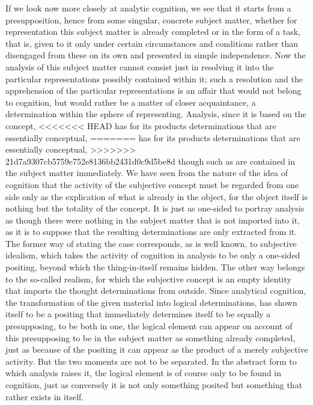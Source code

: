 If we look now more closely at analytic cognition,
we see that it starts from a presupposition,
hence from some singular, concrete subject matter,
whether for representation this subject matter is
already completed or in the form of a task,
that is, given to it only under
certain circumstances and conditions
rather than disengaged from these
on its own and presented in simple independence.
Now the analysis of this subject matter
cannot consist just in resolving it
into the particular representations
possibly contained within it;
such a resolution and the apprehension of
the particular representations is
an affair that would not belong to cognition,
but would rather be a matter of closer acquaintance,
a determination within the sphere of representing.
Analysis, since it is based on the concept,
<<<<<<< HEAD
has for its products determinations that are essentially conceptual,
=======
has for its products determinations
that are essentially conceptual,
>>>>>>> 21d7a9307cb5759e752e8136bb2431d0c9d5be8d
though such as are contained in the subject matter immediately.
We have seen from the nature of the idea of cognition
that the activity of the subjective concept
must be regarded from one side only as
the explication of what is already in the object,
for the object itself is nothing
but the totality of the concept.
It is just as one-sided to portray analysis
as though there were nothing in the subject matter
that is not imported into it,
as it is to suppose that
the resulting determinations are
only extracted from it.
The former way of stating the case corresponds,
as is well known, to subjective idealism,
which takes the activity of cognition in analysis
to be only a one-sided positing,
beyond which the thing-in-itself remains hidden.
The other way belongs to the so-called realism,
for which the subjective concept is an
empty identity that imports
the thought determinations from outside.
Since analytical cognition,
the transformation of the given material
into logical determinations,
has shown itself to be a positing
that immediately determines itself to
be equally a presupposing,
to be both in one,
the logical element can appear
on account of this presupposing to be in
the subject matter as something already completed,
just as because of the positing it can
appear as the product of a merely subjective activity.
But the two moments are not to be separated.
In the abstract form to which analysis raises it,
the logical element is of course
only to be found in cognition,
just as conversely it is not only something posited
but something that rather exists in itself.

